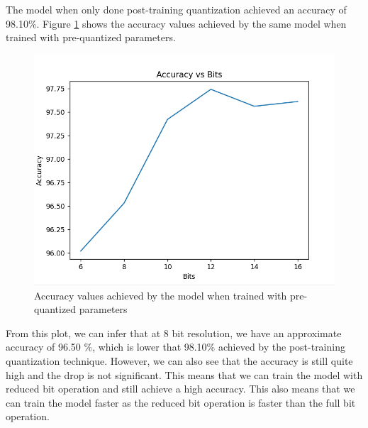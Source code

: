 The model when only done post-training quantization achieved an accuracy of 98.10\%. Figure \ref{trainingOnPeman} shows the accuracy values achieved by the same model when trained with pre-quantized parameters.

\begin{figure}
	\centering
	\includegraphics[width=\textwidth]{images/trainingOnPeman.png}
	\caption{Accuracy values achieved by the model when trained with pre-quantized parameters}
	\label{trainingOnPeman}
\end{figure}

From this plot, we can infer that at 8 bit resolution, we have an approximate accuracy of 96.50 \%, which is lower that 98.10\% achieved by the post-training quantization technique. However, we can also see that the accuracy is still quite high and the drop is not significant. This means that we can train the model with reduced bit operation and still achieve a high accuracy. This also means that we can train the model faster as the reduced bit operation is faster than the full bit operation.

